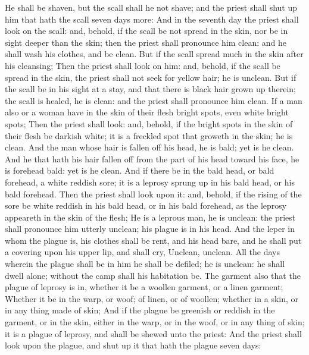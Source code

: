 \begin{biblechapter}
\verse He shall be shaven, but the scall shall he not shave; and the priest shall shut up him that hath the scall seven days more:
\verse And in the seventh day the priest shall look on the scall: and, behold, if the scall be not spread in the skin, nor be in sight deeper than the skin; then the priest shall pronounce him clean: and he shall wash his clothes, and be clean.
\verse But if the scall spread much in the skin after his cleansing;
\verse Then the priest shall look on him: and, behold, if the scall be spread in the skin, the priest shall not seek for yellow hair; he is unclean.
\verse But if the scall be in his sight at a stay, and that there is black hair grown up therein; the scall is healed, he is clean: and the priest shall pronounce him clean.
\verse If a man also or a woman have in the skin of their flesh bright spots, even white bright spots;
\verse Then the priest shall look: and, behold, if the bright spots in the skin of their flesh be darkish white; it is a freckled spot that groweth in the skin; he is clean.
\verse And the man whose hair is fallen off his head, he is bald; yet is he clean.
\verse And he that hath his hair fallen off from the part of his head toward his face, he is forehead bald: yet is he clean.
\verse And if there be in the bald head, or bald forehead, a white reddish sore; it is a leprosy sprung up in his bald head, or his bald forehead.
\verse Then the priest shall look upon it: and, behold, if the rising of the sore be white reddish in his bald head, or in his bald forehead, as the leprosy appeareth in the skin of the flesh;
\verse He is a leprous man, he is unclean: the priest shall pronounce him utterly unclean; his plague is in his head.
\verse And the leper in whom the plague is, his clothes shall be rent, and his head bare, and he shall put a covering upon his upper lip, and shall cry, Unclean, unclean.
\verse All the days wherein the plague shall be in him he shall be defiled; he is unclean: he shall dwell alone; without the camp shall his habitation be.
 The garment also that the plague of leprosy is in, whether it be a woollen garment, or a linen garment;
\verse Whether it be in the warp, or woof; of linen, or of woollen; whether in a skin, or in any thing made of skin;
\verse And if the plague be greenish or reddish in the garment, or in the skin, either in the warp, or in the woof, or in any thing of skin; it is a plague of leprosy, and shall be shewed unto the priest:
\verse And the priest shall look upon the plague, and shut up it that hath the plague seven days:

\end{biblechapter}
